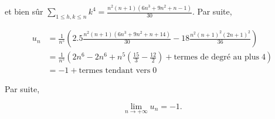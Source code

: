 {\begin{enumerate}
{et bien sûr $\sum_{1\leq h,k\leq
n}^{}k^4=\frac{n^2(n+1)(6n^3+9n^2+n-1)}{30}$. Par suite,

\begin{align*}
u_n&=\frac{1}{n^5}\left(2.5\frac{n^2(n+1)(6n^3+9n^2+n+14)}{30}-18\frac{n^2(n+1)^2(2n+1)^2}{36}\right)\\
 &=\frac{1}{n^5}(2n^6-2n^6+n^5(\frac{15}{3}-\frac{12}{2})+\mbox{termes de degré au plus}\;4)\\
 &=-1+\mbox{termes tendant vers}\;0
\end{align*}

Par suite,

$$\lim_{n\rightarrow +\infty}u_n=-1.$$}
\end{enumerate}
}
